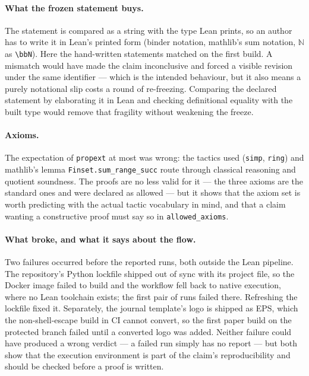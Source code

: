 \documentclass[journal,article,submit,pdftex,moreauthors]{Definitions/mdpi}
\begin{document}
\paragraph{What the frozen statement buys.} The statement is compared as a string with the type Lean prints, so an author has to write it in Lean's printed form (binder notation, mathlib's sum notation, $\mathbb{N}$ as \texttt{\textbackslash bbN}). Here the hand-written statements matched on the first build. A mismatch would have made the claim inconclusive and forced a visible revision under the same identifier --- which is the intended behaviour, but it also means a purely notational slip costs a round of re-freezing. Comparing the declared statement by elaborating it in Lean and checking definitional equality with the built type would remove that fragility without weakening the freeze.

\paragraph{Axioms.} The expectation of \texttt{propext} at most was wrong: the tactics used (\texttt{simp}, \texttt{ring}) and mathlib's lemma \texttt{Finset.sum\_range\_succ} route through classical reasoning and quotient soundness. The proofs are no less valid for it --- the three axioms are the standard ones and were declared as allowed --- but it shows that the axiom set is worth predicting with the actual tactic vocabulary in mind, and that a claim wanting a constructive proof must say so in \texttt{allowed\_axioms}.

\paragraph{What broke, and what it says about the flow.} Two failures occurred before the reported runs, both outside the Lean pipeline. The repository's Python lockfile shipped out of sync with its project file, so the Docker image failed to build and the workflow fell back to native execution, where no Lean toolchain exists; the first pair of runs failed there. Refreshing the lockfile fixed it. Separately, the journal template's logo is shipped as EPS, which the non-shell-escape build in CI cannot convert, so the first paper build on the protected branch failed until a converted logo was added. Neither failure could have produced a wrong verdict --- a failed run simply has no report --- but both show that the execution environment is part of the claim's reproducibility and should be checked before a proof is written.
\end{document}
